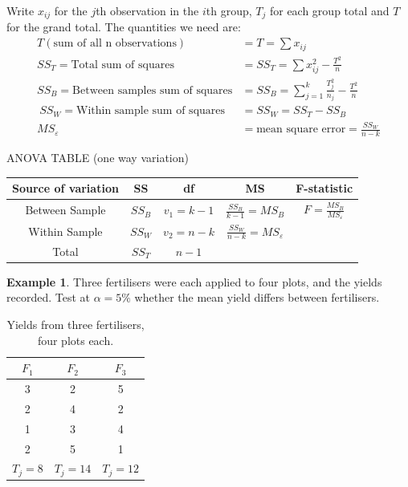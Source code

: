 \documentclass[11pt,a4paper]{article}
\theoremstyle{definition}
\newtheorem{example}[thm]{Example}
\begin{document}
Write $x_{ij}$ for the $j$th observation in the $i$th group, $T_j$ for each group
total and $T$ for the grand total. The quantities we need are:
\begin{align*}
T(\text{sum of all n observations}) & = T =\sum x_{ij}\\[1ex]
SS_T  = \text{Total sum of squares} &= SS_T = \sum x^2_{ij}-\frac{T^2}{n}\\[1ex]
SS_B = \text{Between samples sum of squares} & = SS_B = \sum_{j=1}^{k}\frac{T_j^2}{n_j}-\frac{T^2}{n}\\\
SS_W = \text{Within sample sum of squares} &= SS_W =SS_T - SS_B\\[1ex]
MS_{\varepsilon} & =\text{mean square error} = \frac{SS_W}{n-k}
\end{align*}





\begin{table}[H]
\centering
ANOVA TABLE (one way variation)\\
\begin{tabular}{|c|c|c|c|c|}
\hline
Source of variation & SS & df & MS & F-statistic\\
\hline
Between Sample & $SS_B$ & $v_1=k-1$ & $\frac{SS_B}{k-1}=MS_B$ & $F=\frac{MS_B}{MS_{\varepsilon}}$\\
Within Sample & $SS_W$ & $v_2=n-k$ & $\frac{SS_W}{n-k}=MS_{\varepsilon}$ &\\
\hline
Total & $SS_T$ & $n-1$ &&\\
\hline
\end{tabular}
\end{table}

\begin{example}
Three fertilisers were each applied to four plots, and the yields recorded. Test at
$\alpha=5\%$ whether the mean yield differs between fertilisers.
\begin{table}[H]
\centering
\begin{tabular}{|c|c|c|}
\hline $F_1$ & $F_2$ & $F_3$\\
\hline 3 & 2 & 5\\
2 & 4 & 2\\
1 & 3 & 4\\
2 & 5 & 1\\
\hline
$T_j=8$ & $T_j=14$ & $T_j=12$\\
\hline
\end{tabular}
\caption{Yields from three fertilisers, four plots each.}
\end{table}
\end{example}
\end{document}
